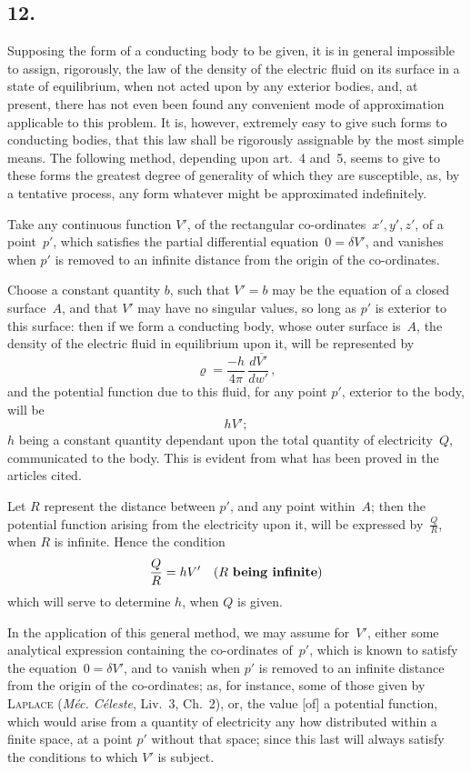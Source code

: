 \documentclass[11pt,notitlepage]{amsart}
\let\Person\textsc
\let\Emphasis\textbf
\let\Title\textit
\newcommand\Section[1]{\subsection{{#1}}}
\renewcommand{\rho}{\varrho}
\begin{document}
\Section{12.}
Supposing the form of a conducting body to be given, it is in general
impossible to assign, rigorously, the law of the density of the electric fluid
on its surface in a state of equilibrium, when not acted upon by any exterior
bodies, and, at present, there has not even been found any convenient mode
of approximation applicable to this problem. It is, however, extremely easy
to give such forms to conducting bodies, that this law shall be rigorously
assignable by the most simple means. The following method, depending upon
art.~4 and~5, seems to give to these forms the greatest degree of generality
of which they are susceptible, as, by a tentative process, any form whatever
might be approximated indefinitely.

Take any continuous function $V'$, of the rectangular
co-ordinates~$x',y',z'$,
of a point~$p'$,
which satisfies the partial differential equation~${0=\delta V'}$,
and vanishes when $p'$ is removed to an infinite distance from the origin of
the co-ordinates.

Choose a constant quantity $b$, such that $V'=b$ may be the equation
of a closed surface~$A$, and that $V'$ may have no singular values, so long as
$p'$ is exterior to this surface: then if we form a conducting body, whose
outer surface is~$A$, the density of the electric fluid in equilibrium upon it,
will be represented by
\[
\rho=\frac{-h}{4\pi}\,\frac{d\overline{V'}}{dw'}\,,
\]
and the potential function due to this fluid, for any point $p'$,
exterior to the body, will be
\[
hV';
\]
$h$ being a constant quantity dependant upon
the total quantity of electricity~$Q$,
communicated to the body. This is evident from what has been proved in
the articles cited.

Let $R$ represent the distance between $p'$, and any point within~$A$;
then the potential function arising from the electricity upon it, will be 
expressed by~$\frac{Q}{R}$, when $R$ is infinite. Hence the condition
\[
\frac QR=hV'\quad\text{($R$ \Emphasis{being infinite})}
\]
which will serve to determine $h$, when $Q$ is given.

In the application of this general method, we may assume for~$V'$,
either some analytical expression containing the co-ordinates of~$p'$, which is
known to satisfy the equation~${0=\delta V'}$,
and to vanish when $p'$ is removed
to an infinite distance from the origin of the co-ordinates; as, for instance,
some of those given by \Person{Laplace}
(\Title{M\'ec. C\'eleste}, Liv.~3, Ch.~2), or, the value
[of] a potential function,
which would arise from a quantity of electricity any how
distributed within a finite space,
at a point $p'$ without that space; since this
last will always satisfy the conditions to which $V'$ is subject.
\end{document}
